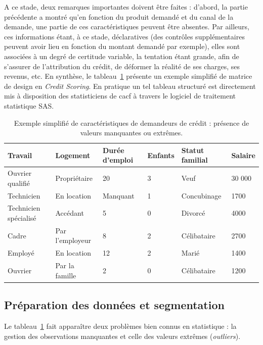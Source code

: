 A ce stade, deux remarques importantes doivent être faites : d'abord, la partie précédente a montré qu'en fonction du produit demandé et du canal de la demande, une partie de ces caractéristiques peuvent être absentes. Par ailleurs, ces informations étant, à ce stade, déclaratives (des contrôles supplémentaires peuvent avoir lieu en fonction du montant demandé par exemple), elles sont associées à un degré de certitude variable, la tentation étant grande, afin de s'assurer de l'attribution du crédit, de déformer la réalité de ses charges, ses revenus, etc. En synthèse, le tableau~\ref{tab:design} présente un exemple simplifié de matrice de design en \textit{Credit Scoring}. En pratique un tel tableau structuré est directement mis à disposition des statisticiens de \gls{cacf} à travers le logiciel de traitement statistique SAS.


\begin{table}
\centering
\caption{\label{tab:design} Exemple simplifié de caractéristiques de demandeurs de crédit : présence de valeurs manquantes ou extrêmes.}
\begin{tabular}{l|l|l|l|l|l}
Travail & Logement & Durée d'emploi & Enfants & Statut familial & Salaire \\
\hline
Ouvrier qualifié & Propriétaire & 20 & 3 & Veuf & 30 000  \\
Technicien & En location & Manquant & 1 & Concubinage & {1700}  \\
Technicien spécialisé & Accédant & 5 & 0 & Divorcé & {4000}  \\
Cadre & Par l'employeur & 8 & 2 & Célibataire & {2700}  \\
Employé & En location & 12 & 2 & Marié & {1400}  \\
Ouvrier & Par la famille & 2 & 0 & Célibataire & {1200}  \\
\end{tabular}
\end{table}

\subsection{Préparation des données et segmentation} \label{subsec:segmentation}

Le tableau~\ref{tab:design} fait apparaître deux problèmes bien connus en statistique : la gestion des observations manquantes et celle des valeurs extrêmes (\textit{outliers}).

